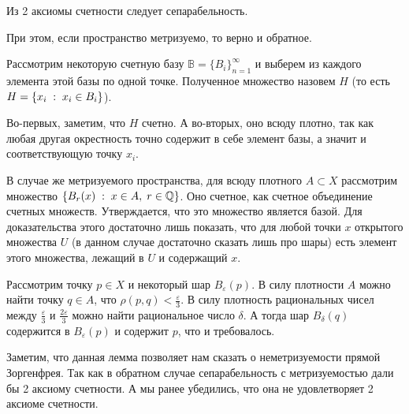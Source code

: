 \begin{Lem}
    Из 2 аксиомы счетности следует сепарабельность.

    При этом, если пространство метризуемо, то верно и обратное.
\end{Lem}
\begin{Proof}
    Рассмотрим некоторую счетную базу $\mathbb{B} = \{B_i\}_{n=1}^\infty$ и выберем из каждого элемента этой базы по одной точке. Полученное множество назовем $H$ (то есть $H = \{ x_i \; : \; x_i \in B_i\}$). 

    Во-первых, заметим, что $H$ счетно. А во-вторых, оно всюду плотно, так как любая другая окрестность точно содержит в себе элемент базы, а значит и соответствующую  точку $x_i$.

    В случае же метризуемого пространства, для всюду плотного $A\subset X$ рассмотрим множество $\{B_r(x) \; : \; x \in A, \; r \in \mathbb{Q}\}$. Оно счетное, как счетное объединение счетных множеств. Утверждается, что это множество является базой. Для доказательства этого достаточно лишь показать, что для любой точки $x$ открытого множества $U$ (в данном случае достаточно сказать лишь про шары)  есть элемент этого множества, лежащий в $U$ и содержащий $x$.

    Рассмотрим точку $p\in X$ и некоторый шар $B_{\varepsilon}(p)$. В силу плотности $A$ можно найти точку $q\in A$, что $\rho(p,q) < \frac{\varepsilon}{3}$. В силу плотность рациональных чисел между $\frac{\varepsilon}{3}$ и $\frac{2\varepsilon}{3}$ можно найти рациональное число $\delta$. А тогда шар $B_\delta (q)$ содержится в $B_\varepsilon(p)$ и содержит $p$, что и требовалось.
\end{Proof}

Заметим, что данная лемма позволяет нам сказать о неметризуемости прямой Зоргенфрея. Так как в обратном случае сепарабельность с метризуемостью дали бы 2 аксиому счетности. А мы ранее убедились, что она не удовлетворяет 2 аксиоме счетности.
